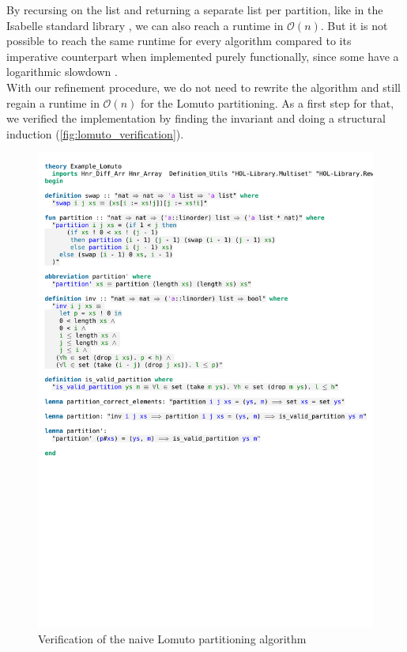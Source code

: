 \noindent By recursing on the list and returning a separate list per partition, like in the Isabelle standard library \parencite{list}, we can also reach a runtime in $\mathcal{O}(n)$. But it is not possible to reach the same runtime for every algorithm compared to its imperative counterpart when implemented purely functionally, since some have a logarithmic slowdown \parencite[p.108]{Pippenger_1997}.\\
With our refinement procedure, we do not need to rewrite the algorithm and still regain a runtime in $\mathcal{O}(n)$ for the Lomuto partitioning. As a first step for that, we verified the implementation by finding the invariant and doing a structural induction (\autoref{fig:lomuto_verification}).

\begin{figure}[htbp]
    \includegraphics[trim={0 11,4cm 0 8,9cm}, clip, width=1.00\textwidth]{figures/Theory_Example_Lomuto_Impl.pdf}
    \caption[Verification of the naive Lomuto partitioning algorithm]{Verification of the naive Lomuto partitioning algorithm}
    \label{fig:lomuto_verification}
\end{figure}

